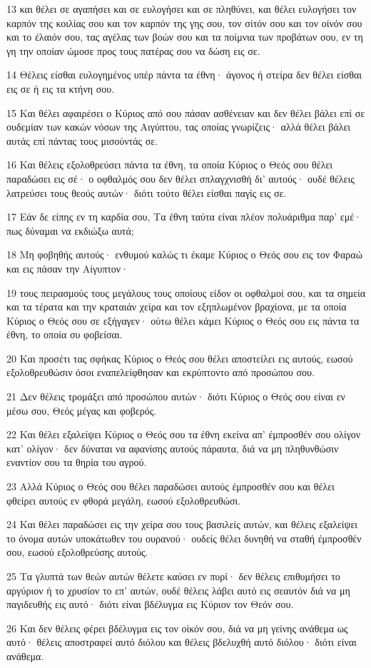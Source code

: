 \par 13 και θέλει σε αγαπήσει και σε ευλογήσει και σε πληθύνει, και θέλει ευλογήσει τον καρπόν της κοιλίας σου και τον καρπόν της γης σου, τον σίτόν σου και τον οίνόν σου και το έλαιόν σου, τας αγέλας των βοών σου και τα ποίμνια των προβάτων σου, εν τη γη την οποίαν ώμοσε προς τους πατέρας σου να δώση εις σε.
\par 14 Θέλεις είσθαι ευλογημένος υπέρ πάντα τα έθνη· άγονος ή στείρα δεν θέλει είσθαι εις σε ή εις τα κτήνη σου.
\par 15 Και θέλει αφαιρέσει ο Κύριος από σου πάσαν ασθένειαν και δεν θέλει βάλει επί σε ουδεμίαν των κακών νόσων της Αιγύπτου, τας οποίας γνωρίζεις· αλλά θέλει βάλει αυτάς επί πάντας τους μισούντάς σε.
\par 16 Και θέλεις εξολοθρεύσει πάντα τα έθνη, τα οποία Κύριος ο Θεός σου θέλει παραδώσει εις σέ· ο οφθαλμός σου δεν θέλει σπλαγχνισθή δι' αυτούς· ουδέ θέλεις λατρεύσει τους θεούς αυτών· διότι τούτο θέλει είσθαι παγίς εις σε.
\par 17 Εάν δε είπης εν τη καρδία σου, Τα έθνη ταύτα είναι πλέον πολυάριθμα παρ' εμέ· πως δύναμαι να εκδιώξω αυτά;
\par 18 Μη φοβηθής αυτούς· ενθυμού καλώς τι έκαμε Κύριος ο Θεός σου εις τον Φαραώ και εις πάσαν την Αίγυπτον·
\par 19 τους πειρασμούς τους μεγάλους τους οποίους είδον οι οφθαλμοί σου, και τα σημεία και τα τέρατα και την κραταιάν χείρα και τον εξηπλωμένον βραχίονα, με τα οποία Κύριος ο Θεός σου σε εξήγαγεν· ούτω θέλει κάμει Κύριος ο Θεός σου εις πάντα τα έθνη, το οποία συ φοβείσαι.
\par 20 Και προσέτι τας σφήκας Κύριος ο Θεός σου θέλει αποστείλει εις αυτούς, εωσού εξολοθρευθώσιν όσοι εναπελείφθησαν και εκρύπτοντο από προσώπου σου.
\par 21 Δεν θέλεις τρομάξει από προσώπου αυτών· διότι Κύριος ο Θεός σου είναι εν μέσω σου, Θεός μέγας και φοβερός.
\par 22 Και θέλει εξαλείψει Κύριος ο Θεός σου τα έθνη εκείνα απ' έμπροσθέν σου ολίγον κατ' ολίγον· δεν δύναται να αφανίσης αυτούς πάραυτα, διά να μη πληθυνθώσιν εναντίον σου τα θηρία του αγρού.
\par 23 Αλλά Κύριος ο Θεός σου θέλει παραδώσει αυτούς έμπροσθέν σου και θέλει φθείρει αυτούς εν φθορά μεγάλη, εωσού εξολοθρευθώσι.
\par 24 Και θέλει παραδώσει εις την χείρα σου τους βασιλείς αυτών, και θέλεις εξαλείψει το όνομα αυτών υποκάτωθεν του ουρανού· ουδείς θέλει δυνηθή να σταθή έμπροσθέν σου, εωσού εξολοθρεύσης αυτούς.
\par 25 Τα γλυπτά των θεών αυτών θέλετε καύσει εν πυρί· δεν θέλεις επιθυμήσει το αργύριον ή το χρυσίον το επ' αυτών, ουδέ θέλεις λάβει αυτό εις σεαυτόν διά να μη παγιδευθής εις αυτό· διότι είναι βδέλυγμα εις Κύριον τον Θεόν σου.
\par 26 Και δεν θέλεις φέρει βδέλυγμα εις τον οίκόν σου, διά να μη γείνης ανάθεμα ως αυτό· θέλεις αποστραφεί αυτό διόλου και θέλεις βδελυχθή αυτό διόλου· διότι είναι ανάθεμα.

